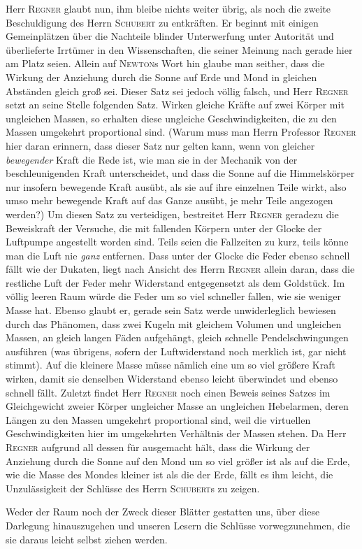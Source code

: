 Herr \textsc{Regner} glaubt nun, ihm bleibe nichts weiter übrig, als noch die zweite Beschuldigung des Herrn \textsc{Schubert} zu entkräften. Er beginnt mit einigen Gemeinplätzen über die Nachteile blinder Unterwerfung unter Autorität und überlieferte Irrtümer in den Wissenschaften, die seiner Meinung nach gerade hier am Platz seien. Allein auf \textsc{Newton}s Wort hin glaube man seither, dass die Wirkung der Anziehung durch die Sonne auf Erde und Mond in gleichen Abständen gleich groß sei. Dieser Satz sei jedoch völlig falsch, und Herr \textsc{Regner} setzt an seine Stelle folgenden Satz. Wirken gleiche Kräfte auf zwei Körper mit ungleichen Massen, so erhalten diese ungleiche Geschwindigkeiten, die zu den Massen umgekehrt proportional sind. (Warum muss man Herrn Professor \textsc{Regner} hier daran erinnern, dass dieser Satz nur gelten kann, wenn von gleicher \emph{bewegender} Kraft die Rede ist, wie man sie in der Mechanik von der beschleunigenden Kraft unterscheidet, und dass die Sonne auf die Himmelskörper nur insofern bewegende Kraft ausübt, als sie auf ihre einzelnen Teile wirkt, also umso mehr bewegende Kraft auf das Ganze ausübt, je mehr Teile angezogen werden?) Um diesen Satz zu verteidigen, bestreitet Herr \textsc{Regner} geradezu die Beweiskraft der Versuche, die mit fallenden Körpern unter der Glocke der Luftpumpe angestellt worden sind. Teils seien die Fallzeiten zu kurz, teils könne man die Luft nie \emph{ganz} entfernen. Dass unter der Glocke die Feder ebenso schnell fällt wie der Dukaten, liegt nach Ansicht des Herrn \textsc{Regner} allein daran, dass die restliche Luft der Feder mehr Widerstand entgegensetzt als dem Goldstück. Im völlig leeren Raum würde die Feder um so viel schneller fallen, wie sie weniger Masse hat. Ebenso glaubt er, gerade sein Satz werde unwiderleglich bewiesen durch das Phänomen, dass zwei Kugeln mit gleichem Volumen und ungleichen Massen, an gleich langen Fäden aufgehängt, gleich schnelle Pendelschwingungen ausführen (was übrigens, sofern der Luftwiderstand noch merklich ist, gar nicht stimmt). Auf die kleinere Masse müsse nämlich eine um so viel größere Kraft wirken, damit sie denselben Widerstand ebenso leicht überwindet und ebenso schnell fällt. Zuletzt findet Herr \textsc{Regner} noch einen Beweis seines Satzes im Gleichgewicht zweier Körper ungleicher Masse an ungleichen Hebelarmen, deren Längen zu den Massen umgekehrt proportional sind, weil die virtuellen Geschwindigkeiten hier im umgekehrten Verhältnis der Massen stehen. Da Herr \textsc{Regner} aufgrund all dessen für ausgemacht hält, dass die Wirkung der Anziehung durch die Sonne auf den Mond um so viel größer ist als auf die Erde, wie die Masse des Mondes kleiner ist als die der Erde, fällt es ihm leicht, die Unzulässigkeit der Schlüsse des Herrn \textsc{Schubert}s zu zeigen.

Weder der Raum noch der Zweck dieser Blätter gestatten uns, über diese Darlegung hinauszugehen und unseren Lesern die Schlüsse vorwegzunehmen, die sie daraus leicht selbst ziehen werden.
